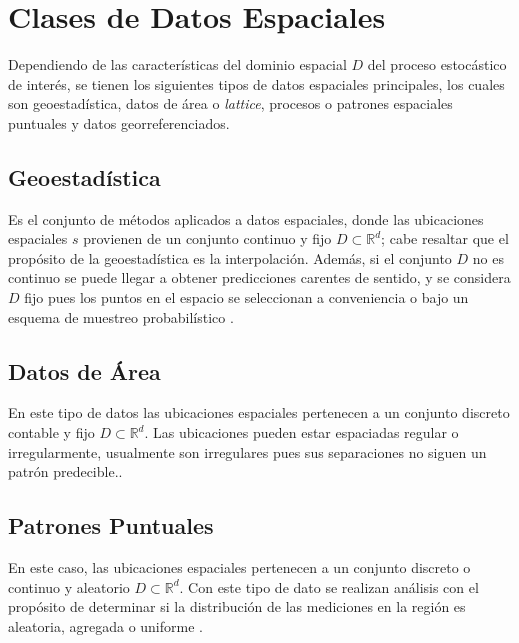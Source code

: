 \documentclass[
]{book}
\begin{document}
\hypertarget{clases-de-datos-espaciales}{%
\section{Clases de Datos Espaciales}\label{clases-de-datos-espaciales}}

Dependiendo de las características del dominio espacial \(D\) del proceso estocástico de interés, se tienen los siguientes tipos de datos espaciales principales, los cuales son geoestadística, datos de área o \textit{lattice}, procesos o patrones espaciales puntuales y datos georreferenciados.

\hypertarget{geoestaduxedstica}{%
\subsection{Geoestadística}\label{geoestaduxedstica}}

Es el conjunto de métodos aplicados a datos espaciales, donde las ubicaciones espaciales \(s\) provienen de un conjunto continuo y fijo \(D \subset \mathbb{R}^d\); cabe resaltar que el propósito de la geoestadística es la interpolación. Además, si el conjunto \(D\) no es continuo se puede llegar a obtener predicciones carentes de sentido, y se considera \(D\) fijo pues los puntos en el espacio se seleccionan a conveniencia o bajo un esquema de muestreo probabilístico \citep{Ramon}.

\hypertarget{datos-de-uxe1rea}{%
\subsection{Datos de Área}\label{datos-de-uxe1rea}}

En este tipo de datos las ubicaciones espaciales pertenecen a un conjunto discreto contable y fijo \(D \subset \mathbb{R}^d\). Las ubicaciones pueden estar espaciadas regular o irregularmente, usualmente son irregulares pues sus separaciones no siguen un patrón predecible.\citep{Cressi}.

\hypertarget{patrones-puntuales}{%
\subsection{Patrones Puntuales}\label{patrones-puntuales}}

En este caso, las ubicaciones espaciales pertenecen a un conjunto discreto o continuo y aleatorio \(D\subset \mathbb{R}^d\). Con este tipo de dato se realizan análisis con el propósito de determinar si la distribución de las mediciones en la región es aleatoria, agregada o uniforme \citep{Ramon}.
\end{document}
